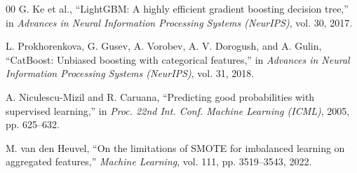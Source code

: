 \documentclass[conference]{IEEEtran}
\begin{document}
\begin{thebibliography}{00}
G. Ke et al., ``LightGBM: A highly efficient gradient boosting decision tree,'' in \textit{Advances in Neural Information Processing Systems (NeurIPS)}, vol. 30, 2017.

L. Prokhorenkova, G. Gusev, A. Vorobev, A. V. Dorogush, and A. Gulin, ``CatBoost: Unbiased boosting with categorical features,'' in \textit{Advances in Neural Information Processing Systems (NeurIPS)}, vol. 31, 2018.

A. Niculescu-Mizil and R. Caruana, ``Predicting good probabilities with supervised learning,'' in \textit{Proc. 22nd Int. Conf. Machine Learning (ICML)}, 2005, pp. 625--632.

M. van den Heuvel, ``On the limitations of SMOTE for imbalanced learning on aggregated features,'' \textit{Machine Learning}, vol. 111, pp. 3519--3543, 2022.

\end{thebibliography}
\end{document}
